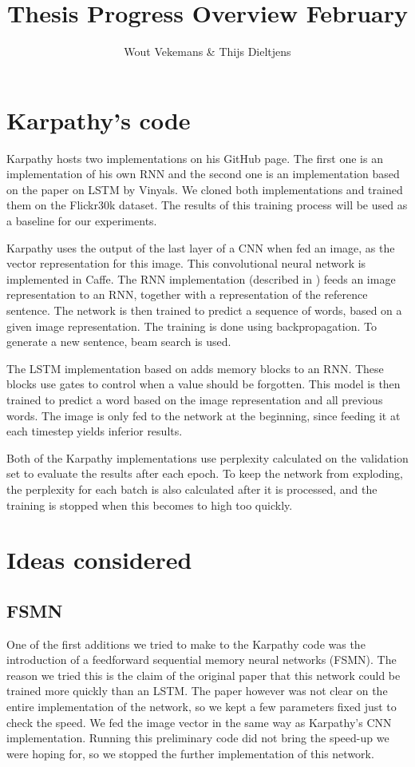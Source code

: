 \documentclass{article}
\title{Thesis Progress Overview February}
\author{Wout Vekemans \& Thijs Dieltjens}
\begin{document}
\maketitle
\section{Karpathy's code}
Karpathy hosts two implementations on his GitHub page. The first one is an implementation of his own RNN and the second one is an implementation based on the paper on LSTM by Vinyals. We cloned both implementations and trained them on the Flickr30k dataset. The results of this training process will be used as a baseline for our experiments.

Karpathy uses the output of the last layer of a CNN when fed an image, as the vector representation for this image. This convolutional neural network is implemented in Caffe.
The RNN implementation (described in \cite{Karpathy2015}) feeds an image representation to an RNN, together with a representation of the reference sentence. The network is then trained to predict a sequence of words, based on a given image representation. The training is done using backpropagation. To generate a new sentence, beam search is used.

The LSTM implementation based on \cite{Google} adds memory blocks to an RNN. These blocks use gates to control when a value should be forgotten. This model is then trained to predict a word based on the image representation and all previous words. The image is only fed to the network at the beginning, since feeding it at each timestep yields inferior results. 

Both of the Karpathy implementations use perplexity calculated on the validation set to evaluate the results after each epoch. To keep the network from exploding, the perplexity for each batch is also calculated after it is processed, and the training is stopped when this becomes to high too quickly.

\section{Ideas considered}
\subsection{FSMN}
One of the first additions we tried to make to the Karpathy code was the introduction of a feedforward sequential memory neural networks (FSMN). The reason we tried this is the claim of the original paper \cite{Zhang} that this network could be trained more quickly than an LSTM. The paper however was not clear on the entire implementation of the network, so we kept a few parameters fixed just to check the speed. We fed the image vector in the same way as Karpathy's CNN implementation. Running this preliminary code did not bring the speed-up we were hoping for, so we stopped the further implementation of this network.
\end{document}
